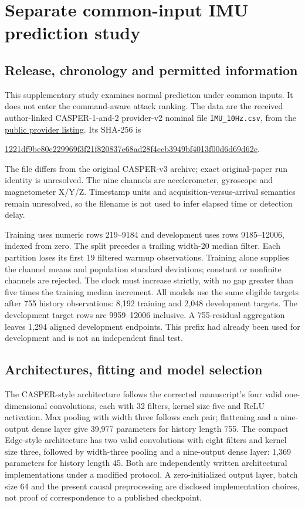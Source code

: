 \section{Separate common-input IMU prediction study}\label{app:imu}
\subsection{Release, chronology and permitted information}
This supplementary study examines normal prediction under common inputs. It does not enter the command-aware attack ranking. The data are the received author-linked CASPER-1-and-2 provider-v2 nominal file \texttt{IMU\_10Hz.csv}, from the \href{https://www.kaggle.com/datasets/hkayan/industrial-robotic-arm-imu-data-casper-1-and-2}{public provider listing}. Its SHA-256 is\nopagebreak[4]
\begin{center}\small\url{1221df9be80c229969f3f21f820837e68ad28f4ccb3949bf4013f00d6d69d62c}.\end{center}
The file differs from the original CASPER-v3 archive; exact original-paper run identity is unresolved. The nine channels are accelerometer, gyroscope and magnetometer X/Y/Z. Timestamp units and acquisition-versus-arrival semantics remain unresolved, so the filename is not used to infer elapsed time or detection delay.

Training uses numeric rows 219--9184 and development uses rows 9185--12006, indexed from zero. The split precedes a trailing width-20 median filter. Each partition loses its first 19 filtered warmup observations. Training alone supplies the channel means and population standard deviations; constant or nonfinite channels are rejected. The clock must increase strictly, with no gap greater than five times the training median increment. All models use the same eligible targets after 755 history observations: 8,192 training and 2,048 development targets. The development target rows are 9959--12006 inclusive. A 755-residual aggregation leaves 1,294 aligned development endpoints. This prefix had already been used for development and is not an independent final test.

\subsection{Architectures, fitting and model selection}
The CASPER-style architecture follows the corrected manuscript's four valid one-dimensional convolutions, each with 32 filters, kernel size five and ReLU activation. Max pooling with width three follows each pair; flattening and a nine-output dense layer give 39,977 parameters for history length 755. The compact Edge-style architecture has two valid convolutions with eight filters and kernel size three, followed by width-three pooling and a nine-output dense layer: 1,369 parameters for history length 45. Both are independently written architectural implementations under a modified protocol. A zero-initialized output layer, batch size 64 and the present causal preprocessing are disclosed implementation choices, not proof of correspondence to a published checkpoint.

